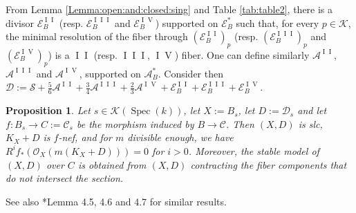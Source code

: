 \documentclass[11pt]{amsart}
\newcommand{\sD}{\mathscr{D}}
\newcommand{\sC}{\mathscr{C}}
\newcommand{\sA}{\mathscr{A}}
\newcommand{\sE}{\mathscr{E}}
\newcommand{\sS}{\mathscr{S}}
\newcommand{\cO}{\mathcal{O}}
\newcommand{\spec}{\operatorname{Spec}}
\newcommand{\Kg}{\mathcal{K}}
\newcommand{\I}{\operatorname{I}}
\newtheorem{Prop}[theorem]{Proposition}
\theoremstyle{definition}
\begin{document}
From Lemma \ref{Lemma:open:and:closed:sing} and Table \ref{tab:table2},
there is a divisor $\sE^{\I\I}_B$ (resp. $\sE^{\I\I\I}_B$ and $\sE^{\I\operatorname{V}}_B$)
supported on $\sE^*_B$ such that, for every $p \in \Kg$,
the minimal resolution of the fiber through $(\sE^{\I\I}_B)_p$ (resp. $(\sE^{\I\I\I}_B)_p$ and $(\sE^{\I\operatorname{V}}_B)_p$) is a
$\I\I$ (resp. $\I \I \I$, $\I \operatorname{V}$) fiber. One can define similarly $\sA^{\I\I}$, $\sA^{\I\I\I}$ and $\sA^{\I \operatorname{V}}$, supported on $\sA^*_B$.
Consider then
$\sD:=\sS+\frac{5}{6} \sA^{\I\I}+ \frac{3}{4} \sA^{\I\I\I}+\frac{2}{3}\sA^{\I \operatorname{V}}+\sE^{\I\I}_B+\sE^{\I\I\I}_B+\sE^{\I\operatorname{V}}_B$.

\begin{Prop}\label{Prop:contracting:E:does:not:contribute:to:cohom}
Let $s \in \Kg(\spec(k))$, let $X:=B_s$, let $D:=\sD_s$ and let $f:B_s\to C:=\sC_s$ be the morphism induced by $B \to \sC$.
Then $(X,D)$ is slc, $K_X+D$ is $f$-nef, and for $m$ divisible enough, we have $R^if_*(\cO_{X}(m( K_X+D)))=0$ for $i>0$. Moreover,
the stable model of $(X,D)$ over $C$ is obtained from $(X,D)$ contracting the fiber components that do not intersect the section.
\end{Prop}
See also \cite{AB1}*{Lemma 4.5, 4.6 and 4.7} for similar results.
\end{document}
